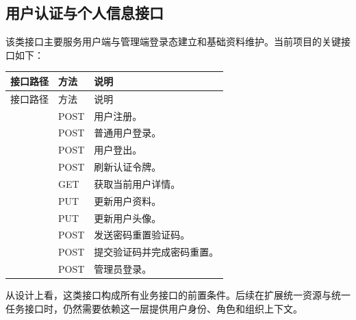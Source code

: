 \subsection{用户认证与个人信息接口}
该类接口主要服务用户端与管理端登录态建立和基础资料维护。当前项目的关键接口如下：
\begingroup
\small
\setlength{\tabcolsep}{4pt}
\renewcommand{\arraystretch}{1.15}
\begin{longtable}{|L{6.2cm}|L{1.4cm}|L{5.6cm}|}
\hline
接口路径 & 方法 & 说明 \\ \hline
\endfirsthead
\hline
接口路径 & 方法 & 说明 \\ \hline
\endhead
\hline
\endfoot
\hline
\endlastfoot
{} & POST & 用户注册。 \\ \hline
{} & POST & 普通用户登录。 \\ \hline
{} & POST & 用户登出。 \\ \hline
{} & POST & 刷新认证令牌。 \\ \hline
{} & GET & 获取当前用户详情。 \\ \hline
{} & PUT & 更新用户资料。 \\ \hline
{} & PUT & 更新用户头像。 \\ \hline
{} & POST & 发送密码重置验证码。 \\ \hline
{} & POST & 提交验证码并完成密码重置。 \\ \hline
{} & POST & 管理员登录。 \\ \hline
\end{longtable}
\endgroup

从设计上看，这类接口构成所有业务接口的前置条件。后续在扩展统一资源与统一任务接口时，仍然需要依赖这一层提供用户身份、角色和组织上下文。

